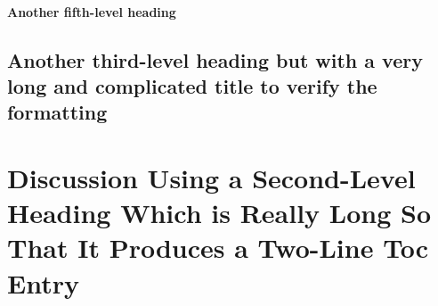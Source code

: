 \paragraph{Another fifth-level heading}
\lipsum[21]

\subsection{Another third-level heading but with a very long and
  complicated title to verify the formatting}
\lipsum[13-15]

\section{Discussion Using a Second-Level Heading
  Which is Really Long So That It Produces a Two-Line
  Toc Entry}
\lipsum[10-12]


\endinput
